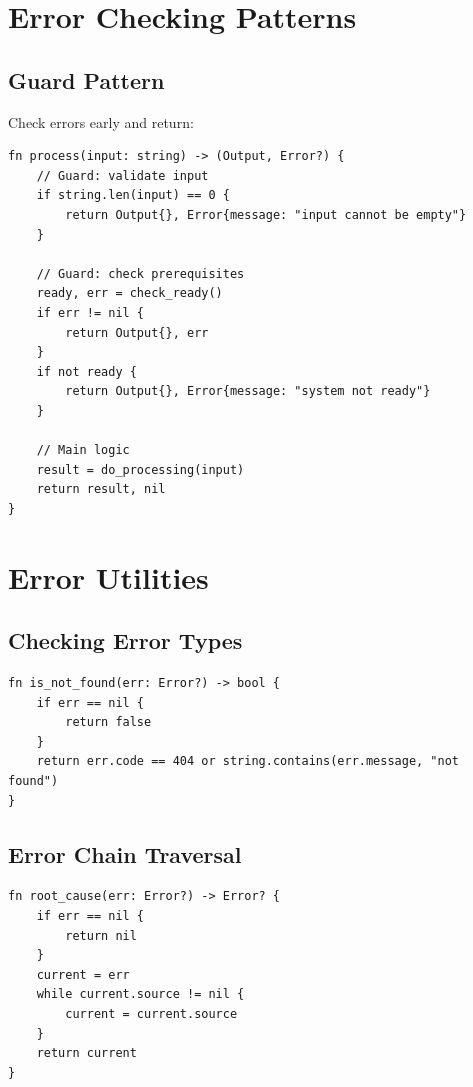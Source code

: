 \section{Error Checking Patterns}

\subsection{Guard Pattern}

Check errors early and return:

\begin{lstlisting}
fn process(input: string) -> (Output, Error?) {
    // Guard: validate input
    if string.len(input) == 0 {
        return Output{}, Error{message: "input cannot be empty"}
    }

    // Guard: check prerequisites
    ready, err = check_ready()
    if err != nil {
        return Output{}, err
    }
    if not ready {
        return Output{}, Error{message: "system not ready"}
    }

    // Main logic
    result = do_processing(input)
    return result, nil
}
\end{lstlisting}

\section{Error Utilities}

\subsection{Checking Error Types}

\begin{lstlisting}
fn is_not_found(err: Error?) -> bool {
    if err == nil {
        return false
    }
    return err.code == 404 or string.contains(err.message, "not found")
}
\end{lstlisting}

\subsection{Error Chain Traversal}

\begin{lstlisting}
fn root_cause(err: Error?) -> Error? {
    if err == nil {
        return nil
    }
    current = err
    while current.source != nil {
        current = current.source
    }
    return current
}
\end{lstlisting}

